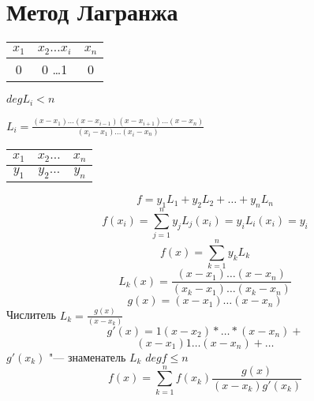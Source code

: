 ﻿\section{Метод Лагранжа}

\begin{tabular}{c|c|c}
$x_1$ & $x_2 \ldots x_i$ & $x_n$\\
\hline
0 & 0 \ldots 1 & 0\\
\end{tabular}

$deg L_i < n$

$L_i = \frac{(x - x_1) \ldots (x - x_{i - 1})(x - x_{i + 1}) \ldots(x - x_n)}{(x_i - x_1) \ldots (x_i - x_n)}$

\begin{tabular}{c|c|c}
$x_1$ & $x_2 \ldots$ & $x_n$\\
\hline
$y_1$ & $y_2 \ldots$ & $y_n$\\
\end{tabular}

$$f = y_1L_1 + y_2L_2 + \ldots + y_n L_n$$
$$f(x_i) = \sum_{j = 1}^{n}y_jL_j(x_i) = y_iL_i(x_i) = y_i$$
$$f(x) = \sum_{k = 1}^{n}y_kL_k$$
$$L_k(x) = \frac{(x - x_1) \ldots (x - x_n)}{(x_k - x_1) \ldots (x_k - x_n)}$$
$$g(x) = (x - x_1) \ldots (x - x_n)$$
Числитель $L_k = \frac{g(x)}{(x - x_k)}$
$$g'(x) = 1(x - x_2)* \ldots * (x - x_n) +$$
$$(x - x_1)1 \ldots (x - x_n) + \ldots$$
$g'(x_k)$ "--- знаменатель $L_k$
$deg f \le n$
$$f(x) = \sum_{k = 1}^{n}f(x_k)\frac{g(x)}{(x - x_k)g'(x_k)}$$ 
